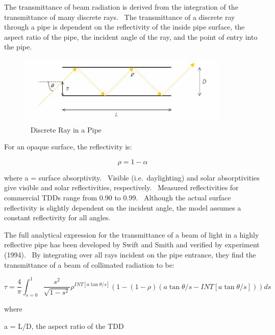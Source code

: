 The transmittance of beam radiation is derived from the integration of the transmittance of many discrete rays.~ The transmittance of a discrete ray through a pipe is dependent on the reflectivity of the inside pipe surface, the aspect ratio of the pipe, the incident angle of the ray, and the point of entry into the pipe.

\begin{figure}[hbtp] %
\centering
\includegraphics[width=0.9\textwidth, height=0.9\textheight, keepaspectratio=true]{media/image871.png}
\caption{  Discrete Ray in a Pipe \protect \label{fig:discrete-ray-in-a-pipe}}
\end{figure}

For an opaque surface, the reflectivity is:

\begin{equation}
\rho  = 1 - \alpha
\end{equation}

where a = surface absorptivity.~ Visible (i.e.~daylighting) and solar absorptivities give visible and solar reflectivities, respectively.~ Measured reflectivities for commercial TDDs range from 0.90 to 0.99.~ Although the actual surface reflectivity is slightly dependent on the incident angle, the model assumes a constant reflectivity for all angles.

The full analytical expression for the transmittance of a beam of light in a highly reflective pipe has been developed by Swift and Smith and verified by experiment (1994).~ By integrating over all rays incident on the pipe entrance, they find the transmittance of a beam of collimated radiation to be:

\begin{equation}
\tau  = \frac{4}{\pi }\int_{s = 0}^1 {\frac{{{s^2}}}{{\sqrt {1 - {s^2}} }}} {\rho ^{INT\left[ {a\tan \theta /s} \right]}}\left( {1 - \left( {1 - \rho } \right)\left( {a\tan \theta /s - INT\left[ {a\tan \theta /s} \right]} \right)} \right)ds
\end{equation}

where

a = L/D, the aspect ratio of the TDD

